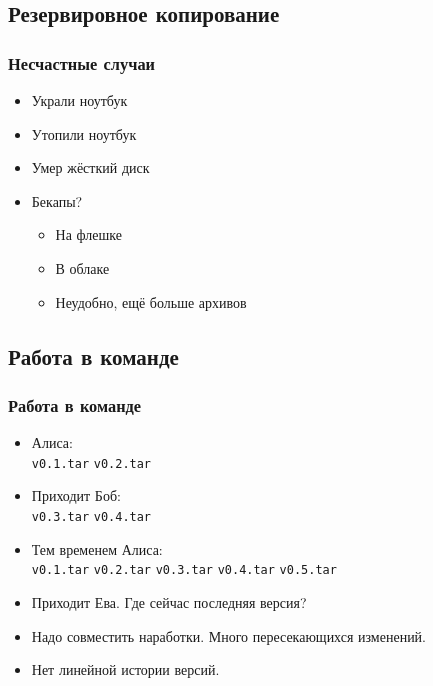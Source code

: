 \documentclass[pdf,russian,aspectratio=169]{beamer}
\begin{document}
\subsection{Резервировное копирование}

\begin{frame}[fragile]
    \frametitle{Несчастные случаи}
    \begin{itemize}
        \pause
        \item Украли ноутбук
        \pause
        \item Утопили ноутбук
        \pause
        \item Умер жёсткий диск
        \pause
        \item Бекапы?
        \pause
        \begin{itemize}
            \item На флешке
            \item В облаке
            \pause
            \item Неудобно, ещё больше архивов
        \end{itemize}
    \end{itemize}
\end{frame}

\subsection{Работа в команде}

\begin{frame}[fragile]
    \frametitle{Работа в команде}
    \begin{itemize}
        \item Алиса: \\
        \pause
            \texttt{\textcolor[HTML]{aa0000}{v0.1.tar}} \quad
            \texttt{\textcolor[HTML]{aa0000}{v0.2.tar}}
        \pause
        \item Приходит Боб: \\
        \pause
            \texttt{\textcolor[HTML]{aa0000}{v0.3.tar}} \quad
            \texttt{\textcolor[HTML]{aa0000}{v0.4.tar}}
        \pause
        \item Тем временем Алиса: \\
            \texttt{\textcolor[HTML]{aa0000}{v0.1.tar}} \quad
            \texttt{\textcolor[HTML]{aa0000}{v0.2.tar}} \quad
            \texttt{\textcolor[HTML]{aa0000}{v0.3.tar}} \quad
            \texttt{\textcolor[HTML]{aa0000}{v0.4.tar}} \quad
            \texttt{\textcolor[HTML]{aa0000}{v0.5.tar}}
        \pause
        \item Приходит Ева. \pause Где сейчас последняя версия?
        \pause
        \item Надо совместить наработки. \pause Много пересекающихся изменений.
        \pause
        \item Нет линейной истории версий.
    \end{itemize}
\end{frame}
\end{document}
